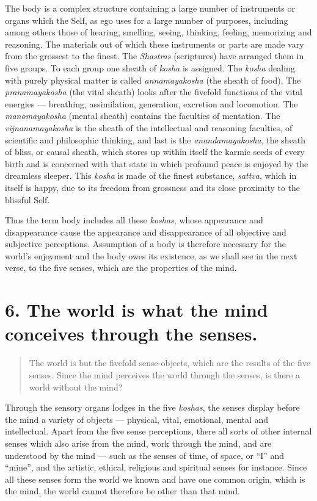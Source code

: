 \documentclass[12pt]{report}
\begin{document}

The body is a complex structure containing a large number of
instruments or organs which the Self, as ego uses for a large number
of purposes, including among others those of hearing, smelling,
seeing, thinking, feeling, memorizing and reasoning. The materials out
of which these instruments or parts are made vary from the grossest to
the finest. The \emph{Shastras} (scriptures) have arranged them in five
groups. To each group one sheath of \emph{kosha} is assigned. The
\emph{kosha} dealing with purely physical matter is called
\emph{annamayakosha} (the sheath of food). The \emph{pranamayakosha}
(the vital sheath) looks after the fivefold functions of the vital
energies --- breathing, assimilation, generation, excretion and
locomotion. The \emph{manomayakosha} (mental sheath) contains the
faculties of mentation. The \emph{vijnanamayakosha} is the sheath of
the intellectual and reasoning faculties, of scientific and
philosophic thinking, and last is the \emph{anandamayakosha}, the
sheath of bliss, or causal sheath, which stores up within itself the
karmic seeds of every birth and is concerned with that state in which
profound peace is enjoyed by the dreamless sleeper. This \emph{kosha}
is made of the finest substance, \emph{sattva}, which in itself is
happy, due to its freedom from grossness and its close proximity to
the blissful Self.

Thus the term body includes all these \emph{koshas}, whose appearance
and disappearance cause the appearance and disappearance of all
objective and subjective perceptions. Assumption of a body is
therefore necessary for the world's enjoyment and the body owes its
existence, as we shall see in the next verse, to the five senses,
which are the properties of the mind.

\section{6. The world is what the mind conceives through the senses.}

\begin{quote}
  The world is but the fivefold sense-objects, which are the results of
  the five senses. Since the mind perceives the world through the
  senses, is there a world without the mind?
\end{quote}


Through the sensory organs lodges in the five \emph{koshas}, the
senses display before the mind a variety of objects --- physical,
vital, emotional, mental and intellectual. Apart from the five sense
perceptions, there all sorts of other internal senses which also arise
from the mind, work through the mind, and are understood by the mind
--- such as the senses of time, of space, or ``I'' and ``mine'', and
the artistic, ethical, religious and spiritual senses for
instance. Since all these senses form the world we known and have one 
common origin, which is the mind, the world cannot therefore be other
than that mind.
\end{document}
